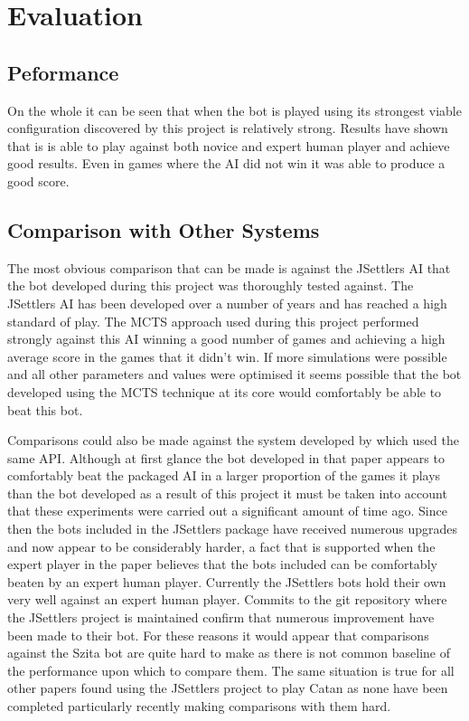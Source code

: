 \documentclass[]{article}
\let\oldsection\section
\renewcommand\section{\clearpage\oldsection}
\begin{document}
\section{Evaluation}
\subsection{Peformance}

On the whole it can be seen that when the bot is played using its strongest viable configuration discovered by this project is relatively strong. Results have shown that is is able to play against both novice and expert human player and achieve good results. Even in games where the AI did not win it was able to produce a good score.

\subsection{Comparison with Other Systems}
The most obvious comparison that can be made is against the JSettlers AI that the bot developed during this project was thoroughly tested against. The JSettlers AI has been developed over a number of years and has reached a high standard of play. The MCTS approach used during this project performed strongly against this AI winning a good number of games and achieving a high average score in the games that it didn't win. If more simulations were possible and all other parameters and values were optimised it seems possible that the bot developed using the MCTS technique at its core would comfortably be able to beat this bot.

Comparisons could also be made against the system developed by \textcite{szita2009monte} which used the same API. Although at first glance the bot developed in that paper appears to comfortably beat the packaged AI in a larger proportion of the games it plays than the bot developed as a result of this project it must be taken into account that these experiments were carried out a significant amount of time ago. Since then the bots included in the JSettlers package have received numerous upgrades and now appear to be considerably harder, a fact that is supported when the expert player in the paper believes that the bots included can be comfortably beaten by an expert human player. Currently the JSettlers bots hold their own very well against an expert human player. Commits to the git repository where the JSettlers project is maintained confirm that numerous improvement have been made to their bot. For these reasons it would appear that comparisons against the Szita bot are quite hard to make as there is not common baseline of the performance upon which to compare them. The same situation is true for all other papers found using the JSettlers project to play Catan as none have been completed particularly recently making comparisons with them hard.  
\end{document}
